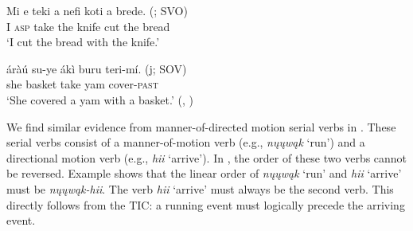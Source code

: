 \documentclass[output=paper]{LSP/langsci}
\begin{document}
\begin{exe}
\ex\label{ex:rosen:35}
\begin{xlist}

\ex \gll Mi e teki a nefi koti a brede. \hspace{2cm} (; SVO)\\
I \textsc{asp} take the knife cut the bread \\
\glt `I cut the bread with the knife.'

\ex
 \gll áràú su-ye ákì buru teri-mí. \hspace{2.6cm} (j; SOV)\\
she basket take yam cover-\textsc{past}\\
\glt `She covered a yam with a basket.' (\citealt[500]{Li1993}, )

\end{xlist}
\end{exe}

We find similar evidence from manner-of-directed motion serial verbs in . These serial verbs consist of a manner-of-motion verb (e.g., \textit{nųųwąk} `run') and a directional motion verb (e.g., \textit{hii} `arrive'). In , the order of these two verbs cannot be reversed. Example  shows that the linear order of \textit{nųųwąk} `run' and \textit{hii} `arrive' must be \textit{nųųwąk-hii}. The verb \textit{hii} `arrive' must always be the second verb. This directly follows from the TIC: a running event must logically precede the arriving event.

\begin{exe}
\ex\label{ex:rosen:36}
\begin{xlist}



\end{xlist}
\end{exe}
\end{document}
